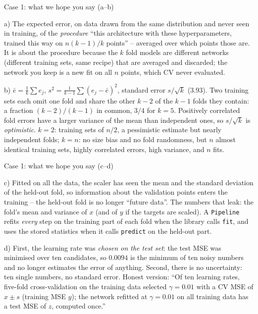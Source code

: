 \documentclass[10pt,aspectratio=169]{beamer}
\begin{document}
\begin{frame}{Case 1: what we hope you say (a--b)}
\small
{}
\pause
\begin{block}{a)}
The expected error, on data drawn from the same distribution and never
seen in training, of the \emph{procedure} ``this architecture with these
hyperparameters, trained this way on $n(k-1)/k$ points'' -- averaged over
which points those are.  It is about the procedure because the $k$ fold
models are different networks (different training sets, same recipe) that
are averaged and discarded; the network you keep is a new fit on all $n$
points, which CV never evaluated.
\end{block}
\pause
\begin{block}{b)}
$\bar e=\frac1k\sum e_j$, $s^{2}=\frac{1}{k-1}\sum(e_j-\bar e)^{2}$,
standard error $s/\sqrt k$ (3.93).  Two training sets each omit one fold
and share the other $k-2$ of the $k-1$ folds they contain: a fraction
$(k-2)/(k-1)$ in common, $3/4$ for $k=5$.  Positively correlated fold
errors have a larger variance of the mean than independent ones, so
$s/\sqrt k$ is \emph{optimistic}.  $k=2$: training sets of $n/2$, a
pessimistic estimate but nearly independent folds; $k=n$: no size bias
and no fold randomness, but $n$ almost identical training sets, highly
correlated errors, high variance, and $n$ fits.
\end{block}
\end{frame}

\begin{frame}{Case 1: what we hope you say (c--d)}
\small
{}
\pause
\begin{block}{c)}
Fitted on all the data, the scaler has seen the mean and the standard
deviation of the held-out fold, so information about the validation points
enters the training -- the held-out fold is no longer ``future data''.  The
numbers that leak: the fold's mean and variance of $x$ (and of $y$ if the
targets are scaled).  A \texttt{Pipeline} refits \emph{every} step on the
training part of each fold when the library calls \texttt{fit}, and uses
the stored statistics when it calls \texttt{predict} on the held-out part.
\end{block}
\pause
\begin{block}{d)}
First, the learning rate was \emph{chosen on the test set}: the test MSE
was minimised over ten candidates, so $0.0094$ is the minimum of ten noisy
numbers and no longer estimates the error of anything.  Second, there is
no uncertainty: ten single numbers, no standard error.  Honest version:
``Of ten learning rates, five-fold cross-validation on the training data
selected $\gamma=0.01$ with a CV MSE of $x\pm s$ (training MSE $y$); the
network refitted at $\gamma=0.01$ on all training data has a test MSE of
$z$, computed once.''
\end{block}
\end{frame}
\end{document}
